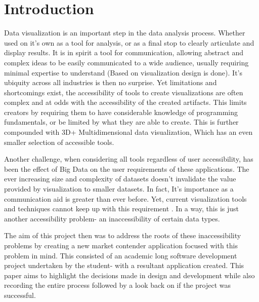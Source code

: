 \section{Introduction}


Data visualization is an important step in the data analysis process. Whether used on it's own as a tool for analysis, or as a final stop to clearly articulate and display results. It is in spirit a tool for communication, allowing abstract and complex ideas to be easily communicated to a wide audience, usually requiring minimal expertise to understand (Based on visualization design is done). It's ubiquity across all industries is then no surprise. Yet limitations and shortcomings exist, the accessibility of tools to create visualizations are often complex and at odds with the accessibility of the created artifacts. This limits creators by requiring them to have considerable knowledge of programming fundamentals, or be limited by what they are able to create. This is further compounded with 3D+ Multidimensional data visualization, Which has an even smaller selection of accessible tools.

Another challenge, when considering all tools regardless of user accessibility, has been the effect of Big Data on the user requirements of these applications. The ever increasing size and complexity of datasets doesn't invalidate the value provided by visualization to smaller datasets. In fact, It's importance as a communication aid is greater than ever before. Yet, current visualization tools and techniques cannot keep up with this requirement \cite{7918044}. In a way, this is just another accessibility problem- an inaccessibility of certain data types.

The aim of this project then was to address the roots of these inaccessibility problems by creating a new market contender application focused with this problem in mind. This consisted of an academic long software development project undertaken by the student- with a resultant application created. This paper aims to highlight the decisions made in design and development while also recording the entire process followed by a look back on if the project was successful.









